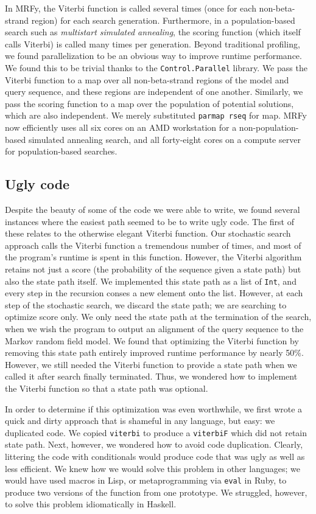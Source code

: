 \documentclass[preprint,nonatbib,blockstyle,nocopyrightspace,times]{sigplanconf}
\begin{document}
In MRFy, the Viterbi function is called several times (once for each 
non-beta-strand region) for each search generation.
Furthermore, in a 
population-based search such as \textit{multistart simulated annealing}, the 
scoring function (which itself calls Viterbi) is called many times per 
generation.
Beyond traditional profiling, we found parallelization to be an 
obvious way to improve runtime performance.
We found this to be trivial thanks 
to the \texttt{Control.Parallel} library.
We pass the Viterbi function to a map over all 
non-beta-strand regions of the model and query sequence, and these regions are 
independent of one another.
Similarly, we pass the scoring function to a map 
over the population of potential solutions, which are also independent.
We 
merely substituted \texttt{parmap rseq} for map.
MRFy now efficiently uses all six 
cores on an AMD workstation for a non-population-based simulated annealing 
search, and all forty-eight cores on a compute server for population-based 
searches.


\subsection{Ugly code}


Despite the beauty of some of the code we were able to write, we found several 
instances where the easiest path seemed to be to write ugly code.
The first of 
these relates to the otherwise elegant Viterbi function.
Our stochastic search 
approach calls the Viterbi function a tremendous number of times, and most of 
the program's runtime is spent in this function.
However, the Viterbi algorithm 
retains not just a score (the probability of the sequence given a state path) 
but also the state path itself.
We implemented this state path as a list of 
\texttt{Int}, and every step in the recursion conses a new element onto the 
list.
However, at each step of the stochastic search, we discard the state 
path; we are searching to optimize score only.
We only need the state path at 
the termination of the search, when we wish the program to output an alignment 
of the query sequence to the Markov random field model.
We found that 
optimizing the Viterbi function by removing this state path entirely improved 
runtime performance by nearly 50\%.
However, we still needed the Viterbi 
function to provide a state path when we called it after search finally 
terminated.
Thus, we wondered how to implement the Viterbi function so that a 
state path was optional.

In order to determine if this optimization was even worthwhile, we first wrote 
a quick and dirty approach that is shameful in any language, but easy: we 
duplicated code.
We copied \texttt{viterbi} to produce a \texttt{viterbiF} 
which did not retain state path.
Next, however, we wondered how to avoid code 
duplication.
Clearly, littering the code with conditionals would produce code 
that was ugly as well as less efficient.
We knew how we would solve this 
problem in other languages; we would have used macros in Lisp, or 
metaprogramming via \texttt{eval} in Ruby, to produce two versions of the 
function from one prototype.
We struggled, however, to solve this problem 
idiomatically in Haskell.
\end{document}
